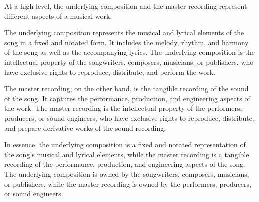 At a high level, the underlying composition and the master recording represent different aspects of a musical work.

The underlying composition represents the musical and lyrical elements of the song in a fixed and notated form. It includes the melody, rhythm, and harmony of the song as well as the accompanying lyrics. The underlying composition is the intellectual property of the songwriters, composers, musicians, or publishers, who have exclusive rights to reproduce, distribute, and perform the work.

The master recording, on the other hand, is the tangible recording of the sound of the song. It captures the performance, production, and engineering aspects of the work. The master recording is the intellectual property of the performers, producers, or sound engineers, who have exclusive rights to reproduce, distribute, and prepare derivative works of the sound recording.

In essence, the underlying composition is a fixed and notated representation of the song's musical and lyrical elements, while the master recording is a tangible recording of the performance, production, and engineering aspects of the song. The underlying composition is owned by the songwriters, composers, musicians, or publishers, while the master recording is owned by the performers, producers, or sound engineers.